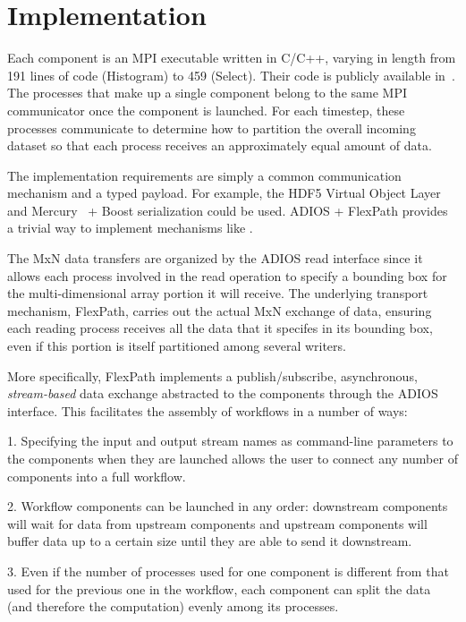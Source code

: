 \section{Implementation}
\label{s:impl}

Each component is an MPI executable
written in C/C++, varying in length from
191 lines of code (Histogram) to
459 (Select).
Their code is publicly available
in~\cite{champsaur:superglue-repo}.
The processes that make up a single
component belong to the same MPI communicator
once the component is launched.
For each timestep, these processes
communicate to determine how to partition
the overall incoming dataset so that each
process receives an approximately
equal amount of data.

The implementation requirements are simply a common communication
mechanism and a typed payload. For example, the HDF5 Virtual Object
Layer~\cite{folk:2011:hdf5} and Mercury~\cite{Soumagne:2013:mercury} +
Boost serialization could be used. ADIOS + FlexPath provides
a trivial way to implement mechanisms like \sys.

The MxN data transfers are organized by the ADIOS
read interface since it allows each process
involved in the read operation to specify a
bounding box for the multi-dimensional
array portion it will receive.
The underlying transport mechanism, FlexPath,
carries out the actual MxN exchange of data,
ensuring each reading process receives
all the data that it specifes in its bounding box,
even if this portion is itself partitioned among several writers.

More specifically, FlexPath implements a publish/subscribe,
asynchronous, \textit{stream-based} data exchange abstracted to the
components through the ADIOS interface. This facilitates
the assembly of \sys workflows in a number of ways:

1. Specifying the input and output stream
names as command-line parameters to the \sys components 
when they are launched allows the user
to connect any number of components into
a full workflow.

2. Workflow components can be
launched in any order: downstream components
will wait for data from 
upstream components and upstream
components will buffer data up to a certain
size until they are able to send it
downstream.

3. Even if the number of processes used for one
component is different from that used for the previous
one in the workflow, each component can split the data
(and therefore the computation) evenly among its processes.

